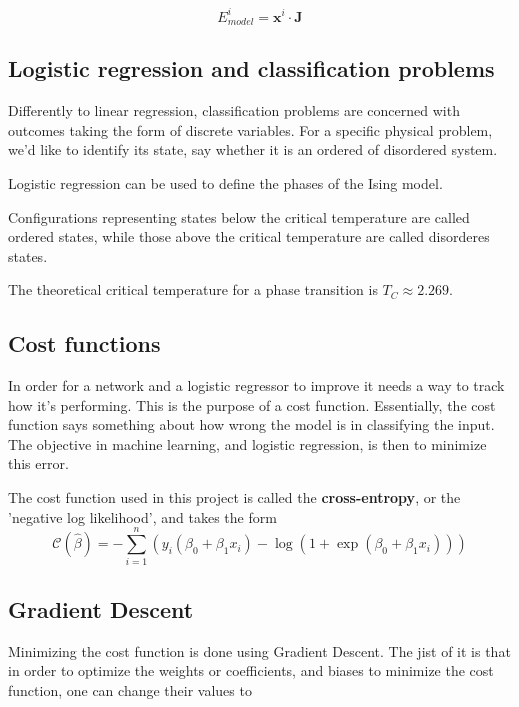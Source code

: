 \begin{equation}
	E_{model}^i = \mathbf{x}^i \cdot \mathbf{J}  
\end{equation}

\subsection{Logistic regression and classification problems}\label{seq:logistic}
Differently to linear regression, classification problems 
are concerned with outcomes taking the form of discrete variables. 
For a specific physical problem, we'd like to identify its state, say whether
it is an ordered of disordered system. ~\cite{LectureNotes-FysStk}

Logistic regression can be used to define the phases of the Ising
model.~\cite{LectureNotes} 

Configurations representing states below the critical temperature are called
ordered states, while those above the critical temperature are called 
disorderes states. ~\cite{Project2} 

The theoretical critical temperature for a phase transition is 
\(T_C \approx 2.269\). 

\subsection{Cost functions}\label{seq:cost}  
In order for a network and a logistic regressor to improve it needs a way to 
track how it's performing. This is the purpose of a cost function. Essentially,
the cost function says something about how wrong the model is in classifying the
input. The objective in machine learning, and logistic regression, is then to minimize
this error.

The cost function used in this project is called the \textbf{cross-entropy}, or the
'negative log likelihood', and takes the form
\begin{equation}\label{eq:cross-entropy}
	\mathcal{C}(\hat{\beta})=-\sum_{i=1}^n  \left(y_i(\beta_0+\beta_1x_i) -\log{(1+\exp{(\beta_0+\beta_1x_i)})}\right)
\end{equation}

\subsection{Gradient Descent}\label{seq:gradient}
Minimizing the cost function is done using Gradient Descent.
The jist of it is that in order to optimize the weights or coefficients, 
and biases to minimize the cost function, one can change their values to 

